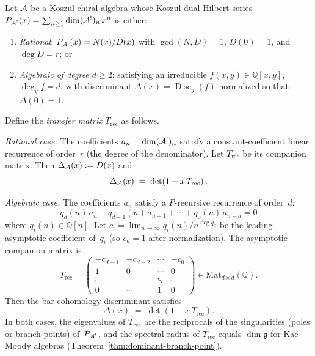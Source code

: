 \begin{theorem}\label{thm:discriminant-spectral}
Let $\mathcal{A}$ be a Koszul chiral algebra whose Koszul dual Hilbert
series $P_{\mathcal{A}^!}(x) = \sum_{n \geq 1} \dim(\mathcal{A}^!)_n\, x^n$
is either:
\begin{enumerate}[label=\textup{(\alph*)}]
\item \emph{Rational}: $P_{\mathcal{A}^!}(x) = N(x)/D(x)$ with
$\gcd(N,D) = 1$, $D(0) = 1$, and $\deg D = r$; or
\item \emph{Algebraic of degree $d \geq 2$}: satisfying an
irreducible $f(x,y) \in \mathbb{Q}[x,y]$, $\deg_y f = d$,
with discriminant $\Delta(x) = \operatorname{Disc}_y(f)$
normalized so that $\Delta(0) = 1$.
\end{enumerate}
Define the \emph{transfer matrix} $T_{\mathrm{rec}}$ as follows.

\emph{Rational case.}
The coefficients $a_n = \dim(\mathcal{A}^!)_n$ satisfy a
constant-coefficient linear recurrence of order~$r$
(the degree of the denominator).  Let $T_{\mathrm{rec}}$
be its companion matrix.  Then $\Delta_{\mathcal{A}}(x) := D(x)$ and
\begin{equation}\label{eq:discriminant-spectral-rational}
\Delta_{\mathcal{A}}(x) \;=\; \det\!\left(1 - x\, T_{\mathrm{rec}}\right).
\end{equation}

\emph{Algebraic case.}
The coefficients $a_n$ satisfy a $P$-recursive recurrence
of order~$d$:
\begin{equation}\label{eq:p-recursive-recurrence}
q_d(n)\, a_n + q_{d-1}(n)\, a_{n-1} + \cdots + q_0(n)\, a_{n-d} = 0
\end{equation}
where $q_i(n) \in \mathbb{Q}[n]$.  Let $c_i = \lim_{n \to \infty}
q_i(n)/n^{\deg q_d}$ be the leading asymptotic coefficient of~$q_i$
\textup{(}so $c_d = 1$ after normalization\textup{)}.
The asymptotic companion matrix is
\[
T_{\mathrm{rec}} =
\begin{pmatrix}
-c_{d-1} & -c_{d-2} & \cdots & -c_0 \\
1 & 0 & \cdots & 0 \\
\vdots & & \ddots & \vdots \\
0 & \cdots & 1 & 0
\end{pmatrix}
\in \mathrm{Mat}_{d \times d}(\mathbb{Q}).
\]
Then the bar-cohomology discriminant satisfies
\begin{equation}\label{eq:discriminant-spectral-general}
\Delta(x) \;=\; \det\!\left(1 - x\, T_{\mathrm{rec}}\right).
\end{equation}
In both cases, the eigenvalues of $T_{\mathrm{rec}}$ are the
reciprocals of the singularities \textup{(}poles or branch
points\textup{)} of~$P_{\mathcal{A}^!}$, and the spectral
radius of $T_{\mathrm{rec}}$ equals $\dim\mathfrak{g}$ for
Kac--Moody algebras
\textup{(}Theorem~\textup{\ref{thm:dominant-branch-point})}.
\end{theorem}

